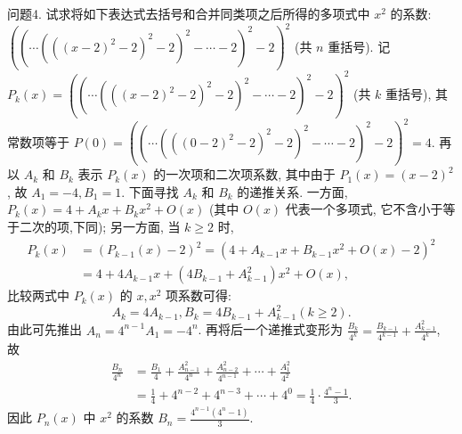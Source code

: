 问题4. 试求将如下表达式去括号和合并同类项之后所得的多项式中 $x^2$ 的系数: $\left(\left(\cdots\left(\left((x-2)^2-2\right)^2-2\right)^2-\cdots-2\right)^2-2\right)^2$ (共 $n$ 重括号).
记 $P_k(x)=\left(\left(\cdots\left(\left((x-2)^2-2\right)^2-2\right)^2-\cdots-2\right)^2-2\right)^2$ (共 $k$ 重括号), 其常数项等于 $P(0)=\left(\left(\cdots\left(\left((0-2)^2-2\right)^2-2\right)^2-\cdots-2\right)^2-2\right)^2=4$.
再以 $A_k$ 和 $B_k$ 表示 $P_k(x)$ 的一次项和二次项系数, 其中由于 $P_1(x)= (x-2)^2$, 故 $A_1=-4, B_1=1$.
下面寻找 $A_k$ 和 $B_k$ 的递推关系.
一方面, $P_k(x)=4+A_k x+B_k x^2+O(x)$ (其中 $O(x)$ 代表一个多项式, 它不含小于等于二次的项,下同); 另一方面, 当 $k \geqslant 2$ 时,
$$
\begin{aligned}
P_k(x) & =\left(P_{k-1}(x)-2\right)^2=\left(4+A_{k-1} x+B_{k-1} x^2+O(x)-2\right)^2 \\
& =4+4 A_{k-1} x+\left(4 B_{k-1}+A_{k-1}^2\right) x^2+O(x),
\end{aligned}
$$
比较两式中 $P_k(x)$ 的 $x, x^2$ 项系数可得:
$$
A_k=4 A_{k-1}, B_k=4 B_{k-1}+A_{k-1}^2(k \geqslant 2) .
$$
由此可先推出 $A_n=4^{n-1} A_1=-4^n$. 再将后一个递推式变形为 $\frac{B_k}{4^k}=\frac{B_{k-1}}{4^{k-1}}+\frac{A_{k-1}^2}{4^k}$, 故
$$
\begin{aligned}
\frac{B_n}{4^n} & =\frac{B_1}{4}+\frac{A_{n-1}^2}{4^n}+\frac{A_{n-2}^2}{4^{n-1}}+\cdots+\frac{A_1^2}{4^2} \\
& =\frac{1}{4}+4^{n-2}+4^{n-3}+\cdots+4^0=\frac{1}{4} \cdot \frac{4^n-1}{3} .
\end{aligned}
$$
因此 $P_n(x)$ 中 $x^2$ 的系数 $B_n=\frac{4^{n-1}\left(4^n-1\right)}{3}$.



